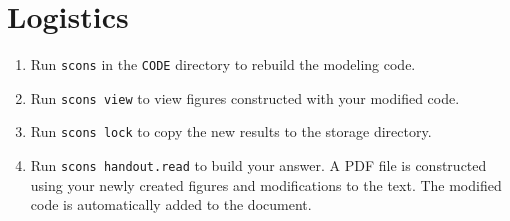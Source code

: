 \section{Logistics}
\begin{enumerate}
\item Run \texttt{scons} in the \texttt{CODE} directory to rebuild the
  modeling code.
\item Run \texttt{scons view} to view figures constructed with your
  modified code. 
\item Run \texttt{scons lock} to copy the new results to the storage
  directory.
\item Run \texttt{scons handout.read} to build your answer. A PDF file
  is constructed using your newly created figures and modifications to
  the text. The modified code is automatically added to the document.
\end{enumerate}

